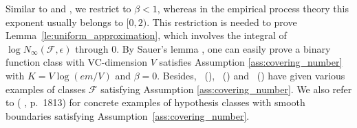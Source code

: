 \documentclass[letterpaper]{article} %
\newcommand{\complexbound}{\beta}
\newcommand{\citet}[1]{\citeauthor{#1}\ (\citeyear{#1})}
\begin{document}
Similar to \cite{Massart2006} and \cite{rejchel2012ranking}, we restrict to $\complexbound{} < 1$, whereas in the empirical process theory this exponent usually belongs to $[0,2)$. This restriction is needed to prove Lemma~\ref{le:uniform_approximation}, which involves the integral of $\log N_\infty(\mathcal{F},\epsilon)$ through $0$.
By Sauer's lemma \cite{sauer1972density}, one can easily prove a binary function class with VC-dimension $V$ satisfies Assumption \ref{ass:covering_number} with $K=V\log(em/V)$ and $\complexbound{}=0$.
Besides, \citet{Dudley1974Metric}, \citet{Korostelev1993Minimax} and \citet{Mammen1995Asymptotical} have given various examples of classes $\mathcal{F}$ satisfying Assumption \ref{ass:covering_number}.
We also refer to (\citeauthor{Mammen1998Smooth} \citeyear{Mammen1998Smooth}, p.\ 1813) for concrete examples of hypothesis classes with smooth boundaries satisfying Assumption~\ref{ass:covering_number}. 
\end{document}
